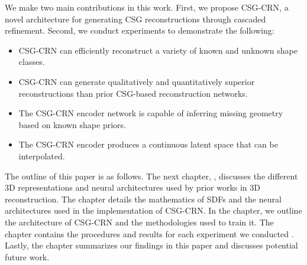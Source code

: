 We make two main contributions in this work. First, we propose CSG-CRN, a novel architecture for generating CSG reconstructions through cascaded refinement. Second, we conduct experiments to demonstrate the following:

\begin{itemize}
	\item CSG-CRN can efficiently reconstruct a variety of known and unknown shape classes.
	\item CSG-CRN can generate qualitatively and quantitatively superior reconstructions than prior CSG-based reconstruction networks.
	\item The CSG-CRN encoder network is capable of inferring missing geometry based on known shape priors.
	\item The CSG-CRN encoder produces a continuous latent space that can be interpolated.
\end{itemize}

\vspace{1em}

The outline of this paper is as follows. The next chapter, , discusses the different 3D representations and neural architectures used by prior works in 3D reconstruction. The  chapter details the mathematics of SDFs and the neural architectures used in the implementation of CSG-CRN. In the  chapter, we outline the architecture of CSG-CRN and the methodologies used to train it. The  chapter contains the procedures and results for each experiment we conducted . Lastly, the  chapter summarizes our findings in this paper and discusses potential future work.